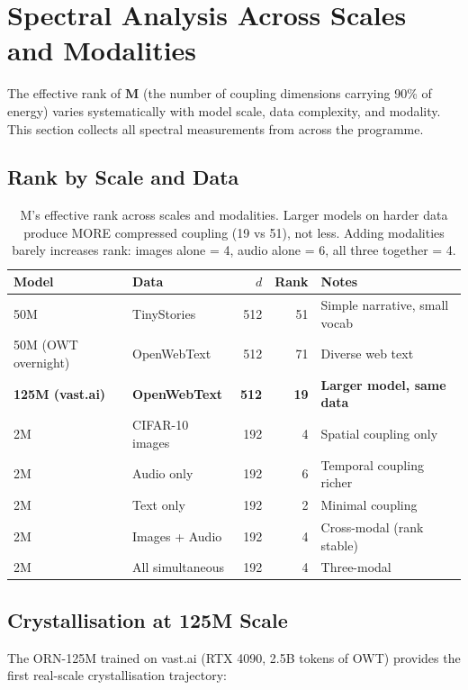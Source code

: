 \documentclass[11pt, a4paper]{article}
\newcommand{\M}{\mathbf{M}}
\theoremstyle{remark}
\begin{document}
\section{Spectral Analysis Across Scales and Modalities}\label{sec:spectral-scales}

The effective rank of $\M$ (the number of coupling dimensions carrying 90\% of energy) varies systematically with model scale, data complexity, and modality.
This section collects all spectral measurements from across the programme.

\subsection{Rank by Scale and Data}

\begin{table}[h]
\centering\small
\begin{tabular}{@{}llrrl@{}}
\toprule
\textbf{Model} & \textbf{Data} & \textbf{$d$} & \textbf{Rank} & \textbf{Notes} \\
\midrule
50M & TinyStories & 512 & 51 & Simple narrative, small vocab \\
50M (OWT overnight) & OpenWebText & 512 & 71 & Diverse web text \\
\textbf{125M (vast.ai)} & \textbf{OpenWebText} & \textbf{512} & \textbf{19} & \textbf{Larger model, same data} \\
2M & CIFAR-10 images & 192 & 4 & Spatial coupling only \\
2M & Audio only & 192 & 6 & Temporal coupling richer \\
2M & Text only & 192 & 2 & Minimal coupling \\
2M & Images + Audio & 192 & 4 & Cross-modal (rank stable) \\
2M & All simultaneous & 192 & 4 & Three-modal \\
\bottomrule
\end{tabular}
\caption{M's effective rank across scales and modalities. Larger models on harder data produce MORE compressed coupling (19 vs 51), not less. Adding modalities barely increases rank: images alone = 4, audio alone = 6, all three together = 4.}
\end{table}

\subsection{Crystallisation at 125M Scale}

The ORN-125M trained on vast.ai (RTX 4090, 2.5B tokens of OWT) provides the first real-scale crystallisation trajectory:
\end{document}
